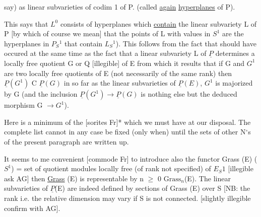 
say) as linear subvarieties of codim 1 of P.  (called \uline{again}
\uline{hyperplanes} of P).

This says that $L^0$ consists of hyperplanes which \uline{contain} the
linear subvariety L of P [by which of course we mean] that the
points of L with values in $S^1$ are the hyperplanes in $P_S{}^1$ that
contain $L_S{}^1$).  This follows from the fact that should have occured
at the same time as the fact that a linear subvariety L of $\underline{P}$
determines a locally free quotient G or Q [illegible] of E from
which it results that if G and $G^1$ are two locally free quotients of
E (not necessarily of the same rank) then $\underline{P}(G^1)$ C $\underline{P}(G)$ in so far as
the linear subvarieties of $\underline{P}(E)$, $G^1$ is majorized by G (and the
inclusion $\underline{P}(G^1) \rightarrow \underline{P}(G)$ is nothing else but the deduced morphism G
$\rightarrow G^1$).

Here is a minimum of the [sorites Fr]* which we must have at
our disposal.  The complete list cannot in any case be fixed (only
when) until the sets of other N$^{\circ}$s
 of the present paragraph are
written up.

It seems to me convenient [commode Fr] to introduce also the
functor Grass (E) ($S^1$) = set of quotient modules locally free (of
rank not specified) of $E_S1$ [illegible ask AG]
then \uline{Grass} (E) is representable by n $\geq$ 0 $\mathrm{Grass}_n$(E).  The linear
subvarieties of $\underline{P}$(E) are indeed defined by sections of Grass (E)
over S [NB:  the rank i.e. the relative dimension may vary if S is
not connected.  [slightly illegible confirm with AG].

